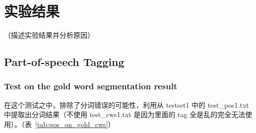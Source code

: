 \section{实验结果}
\label{sec:result}

（描述实验结果并分析原因）

\subsection*{Part-of-speech Tagging}

\subsubsection*{Test on the gold word segmentation result}

在这个测试之中，排除了分词错误的可能性，利用从 testset1 中的 test\_pos1.txt 中提取出分词结果（不使用 test\_cws1.txt 是因为里面的 tag 全是乱的完全无法使用）。（表~\ref{tab:pos_on_gold_cws}）


